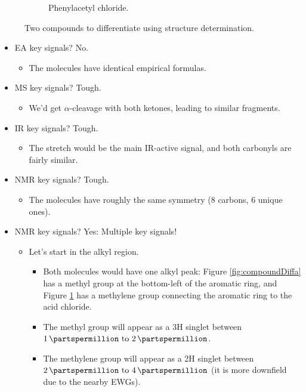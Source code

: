 \documentclass[../notes.tex]{subfiles}
\begin{document}
\begin{itemize}
\begin{figure}[h!]
\begin{subfigure}[b]{0.3\linewidth}
            \centering
            \caption{Phenylacetyl chloride.}
            \label{fig:compoundDiffb}
        \end{subfigure}
        \caption{Two compounds to differentiate using structure determination.}
        \label{fig:compoundDiff}
    \end{figure}
    \begin{itemize}
        \item EA key signals? No.
        \begin{itemize}
            \item The molecules have identical empirical formulas.
        \end{itemize}
        \item MS key signals? Tough.
        \begin{itemize}
            \item We'd get $\alpha$-cleavage with both ketones, leading to similar fragments.
        \end{itemize}
        \item IR key signals? Tough.
        \begin{itemize}
            \item The  stretch would be the main IR-active signal, and both carbonyls are fairly similar.
        \end{itemize}
        \item {} NMR key signals? Tough.
        \begin{itemize}
            \item The molecules have roughly the same symmetry (8 carbons, 6 unique ones).
        \end{itemize}
        \item {} NMR key signals? Yes: Multiple key signals!
        \begin{itemize}
            \item Let's start in the alkyl region.
            \begin{itemize}
                \item Both molecules would have one alkyl peak: Figure \ref{fig:compoundDiffa} has a methyl group at the bottom-left of the aromatic ring, and Figure \ref{fig:compoundDiffb} has a methylene group connecting the aromatic ring to the acid chloride.
                \item The methyl group will appear as a 3H singlet between $\SIrange{1}{2}{\partspermillion}$.
                \item The methylene group will appear as a 2H singlet between $\SIrange{2}{4}{\partspermillion}$ (it is more downfield due to the nearby EWGs).

\end{itemize}
\end{itemize}
\end{itemize}
\end{itemize}
\end{document}
